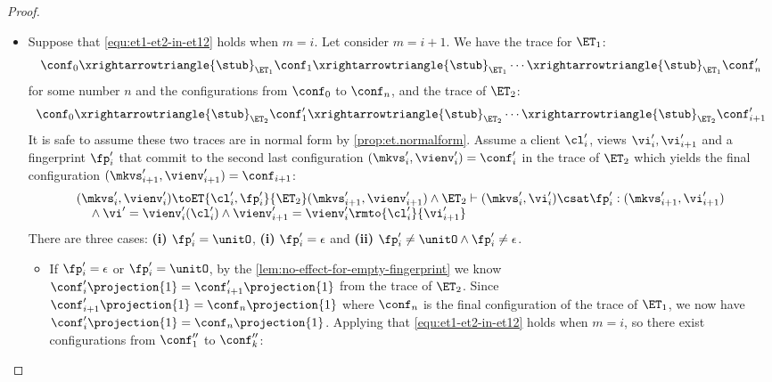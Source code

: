 \begin{proof}
\begin{itemize}
\item {}
Suppose that \cref{equ:et1-et2-in-et12} holds when \( m = i \).
Let consider \( m = i + 1 \).
We have the trace for \( \ET_1 \):
\begin{equation}
    \conf_0 \xrightarrowtriangle{\stub}_{\ET_{1}} \conf_1 \xrightarrowtriangle{\stub}_{\ET_{1}} \cdots \xrightarrowtriangle{\stub}_{\ET_{1}} \conf'_{n} 
\end{equation}
for some number \( n \) and the configurations from \(\conf_0\) to \( \conf_n \), and the trace of \(\ET_2\):
\begin{equation}
    \conf_0 \xrightarrowtriangle{\stub}_{\ET_{2}} \conf'_1 \xrightarrowtriangle{\stub}_{\ET_{2}} \cdots \xrightarrowtriangle{\stub}_{\ET_{2}} \conf'_{i+1} 
\end{equation}
It is safe to assume these two traces are in normal form by \cref{prop:et.normalform}.
Assume a client \( \cl'_{i} \), views \( \vi'_{i}, \vi'_{i+1} \) and a fingerprint \( \fp'_{i} \) that commit to the second last configuration \( (\mkvs'_i, \vienv'_i) = \conf'_i \) in the trace of \( \ET_2 \) which yields the final configuration \( (\mkvs'_{i+1}, \vienv'_{i+1}) = \conf_{i+1} \):
\begin{equation}
    \label{equ:last-et-2}
    \begin{array}{@{}l @{}}
        (\mkvs'_i, \vienv'_i) \toET{\cl'_{i}, \fp'_{i}}{\ET_2} (\mkvs'_{i+1}, \vienv'_{i+1}) \land \ET_2 \vdash (\mkvs'_i, \vi'_i) \csat \fp'_i  : (\mkvs'_{i+1},\vi'_{i+1}) \\
        \quad {} \land \vi' = \vienv'_i(\cl'_i) \land \vienv'_{i+1} = \vienv'_i\rmto{\cl'_i}{\vi'_{i+1}}
    \end{array}
\end{equation}
There are three cases: \textbf{(i)} \( \fp'_i = \unitO \), \textbf{(i)} \( \fp'_i = \epsilon \) and \textbf{(ii)} \( \fp'_i \neq \unitO \land \fp'_i \neq \epsilon \).
\begin{itemize}
    \item If \( \fp'_i = \epsilon \) or \( \fp'_i = \unitO \), by the \cref{lem:no-effect-for-empty-fingerprint} we know \( \conf'_{i}\projection{1} = \conf'_{i+1}\projection{1}\) from the trace of \( \ET_2 \).
Since \( \conf'_{i+1}\projection{1} = \conf_n\projection{1}\) where \( \conf_n \) is the final configuration of the trace of \( \ET_1 \), we now have \( \conf'_{i}\projection{1} = \conf_n\projection{1}\).
Applying \ih that \cref{equ:et1-et2-in-et12} holds when \( m = i \), so there exist configurations from \( \conf''_1 \) to \( \conf''_k \):

\end{itemize}
\end{itemize}
\end{proof}
